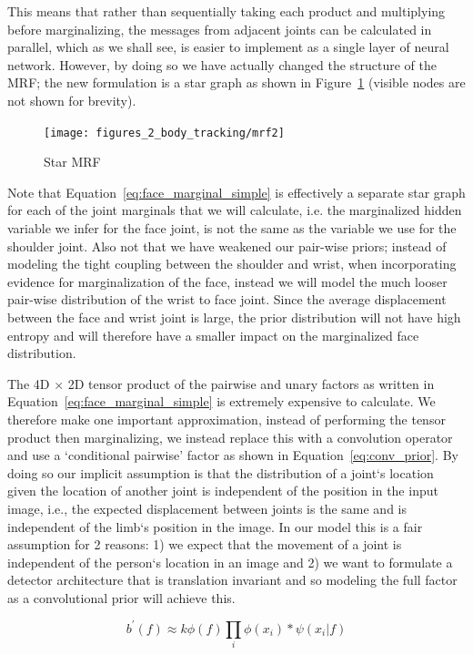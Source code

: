 This means that rather than sequentially taking each product and multiplying before marginalizing, the messages from adjacent joints can be calculated in parallel, which as we shall see, is easier to implement as a single layer of neural network. However, by doing so we have actually changed the structure of the MRF; the new formulation is a star graph as shown in Figure~\ref{fig:mrf2} (visible nodes are not shown for brevity).

\begin{figure}[th]
  \centering
    \texttt{[image: figures\_2\_body\_tracking/mrf2]}
    \caption{Star MRF}
  \label{fig:mrf2} 
\end{figure}

Note that Equation~\ref{eq:face_marginal_simple} is effectively a separate star graph for each of the joint marginals that we will calculate, i.e. the marginalized hidden variable we infer for the face joint, is not the same as the variable we use for the shoulder joint.  Also not that we have weakened our pair-wise priors; instead of modeling the tight coupling between the shoulder and wrist, when incorporating evidence for marginalization of the face, instead we will model the much looser pair-wise distribution of the wrist to face joint. Since the average displacement between the face and wrist joint is large, the prior distribution will not have high entropy and will therefore have a smaller impact on the marginalized face distribution.

The 4D $\times$ 2D tensor product of the pairwise and unary factors as written in Equation~\ref{eq:face_marginal_simple} is extremely expensive to calculate. We therefore make one important approximation, instead of performing the tensor product then marginalizing, we instead replace this with a convolution operator and use a `conditional pairwise' factor as shown in Equation~\ref{eq:conv_prior}. By doing so our implicit assumption is that the distribution of a joint`s location given the location of another joint is independent of the position in the input image, i.e., the expected displacement between joints is the same and is independent of the limb`s position in the image. In our model this is a fair assumption for 2 reasons: 1) we expect that the movement of a joint is independent of the person`s location in an image and 2) we want to formulate a detector architecture that is translation invariant and so modeling the full factor as a convolutional prior will achieve this.

\begin{equation}
b^\prime\left(f\right)\approx k\phi(f)\prod_i \phi(x_i)\ast\psi(x_i|f)
\label{eq:conv_prior}
\end{equation}

